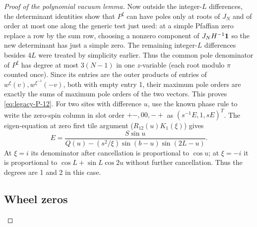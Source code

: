\begin{proof}[Proof of the polynomial vacuum lemma]
Now outside the integer-\(L\) differences, the determinant identities show that \(P^\xi\) can have poles only at roots of \(J_N\) and of order at most one along the generic test just used: at a simple Pfaffian zero replace a row by the sum row, choosing a nonzero component of \(J_NH^{-1}{\bf1}\) so the new determinant has just a simple zero. The remaining integer-\(L\) differences besides \(4L\) were treated by simplicity earlier. Thus the common pole denominator of \(P^\xi\) has degree at most \(3(N-1)\) in one \(z\)-variable (each root modulo \(\pi\) counted once). Since its entries are the outer products of entries of \(w^\xi(v), w^{\xi^{-1}}(-v)\), both with empty entry 1, their maximum pole orders are exactly the sums of maximum pole orders of the two vectors. This proves \eqref{eq:legacy-P-12}. For two sites with difference \(u\), use the known phase rule to write the zero-spin column in slot order \(+-,00,-+\) as \((s^{-1}E,1,s E)^T\). The eigen-equation at zero first tile argument (\(R_{12}(u)K_1(\xi)\)) gives
\[
 E=\frac{S\sin u}{Q(u)- (s^2/\xi)\sin(b-u)\sin(2L-u)}.
\]
At \(\xi=i\) its denominator after cancellation is proportional to \(\cos u\); at \(\xi=-i\) it is proportional to \(\cos L+\sin L\cos 2u\) without further cancellation. Thus the degrees are 1 and 2 in this case.

\subsection{Wheel zeros}\label{c6:subheading-06}


\end{proof}
